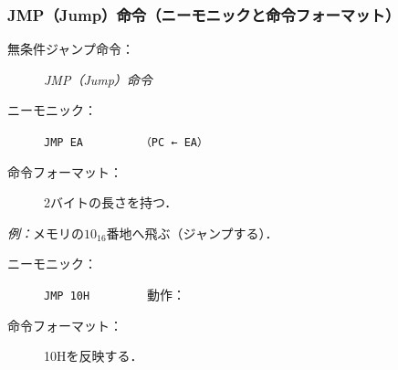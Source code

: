 \documentclass{beamer}                 %
\begin{document}
\begin{frame}
  \frametitle{JMP（Jump）命令（ニーモニックと命令フォーマット）}
  \begin{description}
  \item[無条件ジャンプ命令：]\emph{JMP（Jump）命令}
    \vfill

  \item[ニーモニック：]\texttt{JMP EA}~~~~~~~~~\texttt{（PC ← EA）}
    \vfill

  \item[命令フォーマット：] 2バイトの長さを持つ．\\
  \end{description}
  \vfill

  \emph{例：}メモリの$10_{16}$番地へ飛ぶ（ジャンプする）．
  \begin{description}
  \item[ニーモニック：]\texttt{JMP 10H}~~~~~~~~~動作：

  \item[命令フォーマット：] 10Hを反映する．\\
  \end{description}
  \vfill
\end{frame}
\end{document}

